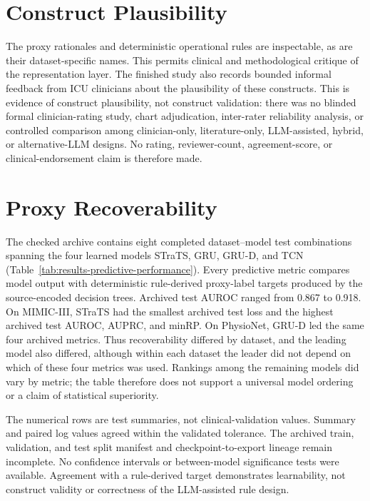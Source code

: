 \section{Construct Plausibility}
\label{sec:results:construct-plausibility}

The proxy rationales and deterministic operational rules are inspectable, as are their dataset-specific names.  This permits clinical and methodological critique of the representation layer.  The finished study also records bounded informal feedback from ICU clinicians about the plausibility of these constructs.  This is evidence of construct plausibility, not construct validation: there was no blinded formal clinician-rating study, chart adjudication, inter-rater reliability analysis, or controlled comparison among clinician-only, literature-only, LLM-assisted, hybrid, or alternative-LLM designs.  No rating, reviewer-count, agreement-score, or clinical-endorsement claim is therefore made.

\section{Proxy Recoverability}
\label{sec:results:predictive-performance}

The checked archive contains eight completed dataset--model test combinations spanning the four learned models STraTS, GRU, GRU-D, and TCN (Table~\ref{tab:results-predictive-performance}).  Every predictive metric compares model output with deterministic rule-derived proxy-label targets produced by the source-encoded decision trees.  Archived test AUROC ranged from 0.867 to 0.918.  On MIMIC-III, STraTS had the smallest archived test loss and the highest archived test AUROC, AUPRC, and minRP.  On PhysioNet, GRU-D led the same four archived metrics.  Thus recoverability differed by dataset, and the leading model also differed, although within each dataset the leader did not depend on which of these four metrics was used.  Rankings among the remaining models did vary by metric; the table therefore does not support a universal model ordering or a claim of statistical superiority.

The numerical rows are test summaries, not clinical-validation values.  Summary and paired log values agreed within the validated tolerance.  The archived train, validation, and test split manifest and checkpoint-to-export lineage remain incomplete.  No confidence intervals or between-model significance tests were available.  Agreement with a rule-derived target demonstrates learnability, not construct validity or correctness of the LLM-assisted rule design.

